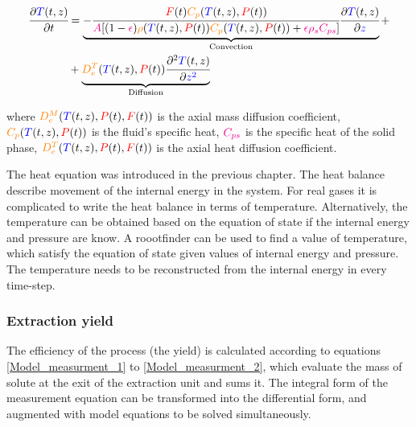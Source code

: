 \documentclass[../Article_Model_Parameters.tex]{subfiles}
\begin{document}
			{\footnotesize
				\begin{equation} \label{Model_heat}
					\begin{split}
						\cfrac{\partial {\color{blue}T}(t,z)}{\partial t} &= 
						\underbrace{ -\cfrac{{\color{red}F}(t) {\color{orange}C_p}({\color{blue}T}(t,z),{\color{red}P}(t))}{{\color{magenta}A} 	[(1-{\color{magenta}\epsilon}){\color{orange}\rho}({\color{blue}T}(t,z),{\color{red}P}(t)) {\color{orange}C_p} ({\color{blue}T}(t,z),{\color{red}P}(t)) + {\color{magenta} \epsilon \rho_s C_{ps} } ]} \cfrac{\partial {\color{blue}T}(t,z)}{\partial {\color{blue}z}}  }_{\text{Convection}} + \\
						& + \underbrace{ {\color{orange}D^T_e}({\color{blue}T}(t,z),{\color{red}P}(t)) \cfrac{\partial^2 {\color{blue}T}(t,z)}{\partial {\color{blue}z^2}} }_{\text{Diffusion}}
					\end{split}
			\end{equation} }
			
		where $ {\color{orange}D^M_e}({\color{blue}T}(t,z),{\color{red}P}(t),{\color{red}F}(t))$ is the axial mass diffusion coefficient, ${\color{orange}C_p}({\color{blue}T}(t,z),{\color{red}P}(t))$ is the fluid's specific heat, ${\color{magenta}C_{ps}}$ is the specific heat of the solid phase, ${\color{orange}D^T_e}({\color{blue}T}(t,z),{\color{red}P}(t),{\color{red}F}(t))$ is the axial heat diffusion coefficient.

        {\color{blue} The heat equation was introduced in the previous chapter. The heat balance describe movement of the internal energy in the system. For real gases it is complicated to write the heat balance in terms of temperature. Alternatively, the temperature can be obtained based on the equation of state if the internal energy and pressure are know. A roootfinder can be used to find a value of temperature, which satisfy the equation of state given values of internal energy and pressure. The temperature needs to be reconstructed from the internal energy in every time-step.
		}
  
		\subsubsection{Extraction yield} \label{CH: Yield} 
			
		The efficiency of the process (the yield) is calculated according to equations \ref{Model_measurment_1} to \ref{Model_measurment_2}, which evaluate the mass of solute at the exit of the extraction unit and sums it. The integral form of the measurement equation can be transformed into the differential form, and augmented with model equations to be solved simultaneously.
			
\end{document}
